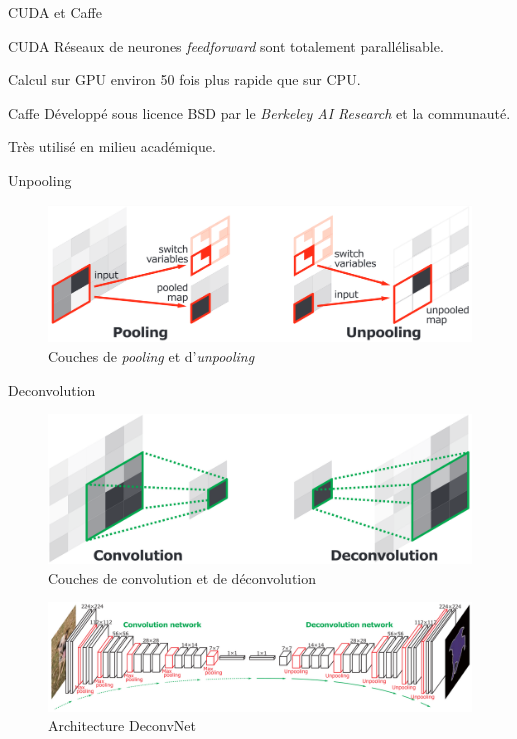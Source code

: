 \documentclass[11pt]{beamer}
\begin{document}
\begin{frame}{CUDA et Caffe}
	\begin{block}{CUDA}
		Réseaux de neurones \emph{feedforward} sont totalement parallélisable.
		
		Calcul sur GPU environ 50 fois plus rapide que sur CPU.
	\end{block}
	\begin{block}{Caffe}
		Développé sous licence BSD par le \emph{Berkeley AI Research} et la communauté.

		Très utilisé en milieu académique.	
	\end{block}
\end{frame}

\begin{frame}{Unpooling}
	\begin{figure}[H]
		\centering
		\includegraphics[scale=0.25]{Images/Unpooling.png}
		\caption{Couches de \emph{pooling} et d'\emph{unpooling}}
	\end{figure}
\end{frame}
\begin{frame}{Deconvolution}
	\begin{figure}[H]
		\centering
		\includegraphics[scale=0.25]{Images/Deconvolution.png}
		\caption{Couches de convolution et de déconvolution}
	\end{figure}
\end{frame}
\begin{frame}
	\begin{figure}[H]
		\centering
		\includegraphics[scale=0.25]{Images/DeconvNet.png}
		\caption{Architecture DeconvNet}
	\end{figure}
\end{frame}
\end{document}
